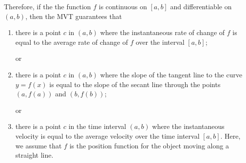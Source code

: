 \documentclass{ximera}
\begin{document}
Therefore, if the the function $f$ is continuous on $[a,b]$ and differentiable on $(a,b)$, then the MVT guarantees that
\begin{enumerate}
\item there is a point $c$ in $(a,b)$ where the instantaneous rate of change of $f$ is equal to the average rate of change of $f$ over the interval $[a,b]$;

or

\item there is a point $c$ in $(a,b)$ where the slope of the tangent line to the curve $y=f(x)$ is equal to the slope of the secant line through the points $(a,f(a))$  and $(b,f(b))$;

or

\item there is a point $c$ in the time interval $(a,b)$ where the instantaneous velocity is equal to the average velocity over the time interval $[a,b]$. Here, we assume that $f$ is the position function for the object moving along a straight line.
\end{enumerate}
\end{document}
